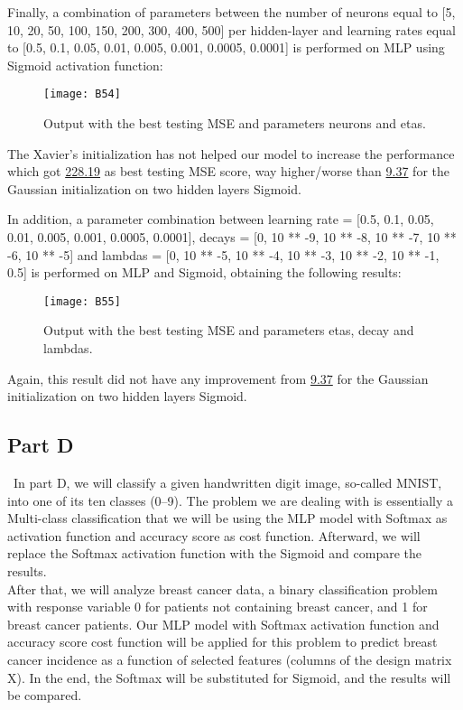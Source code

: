 Finally, a combination of parameters between the number of neurons equal to [5, 10, 20, 50, 100, 150, 200, 300, 400, 500] per hidden-layer and learning rates equal to [0.5, 0.1, 0.05, 0.01, 0.005, 0.001, 0.0005, 0.0001] is performed on MLP using Sigmoid activation function:

\begin{figure}[H]
\label{fig:B32}
\centering
\texttt{[image: B54]}
\caption{Output with the best testing MSE and parameters neurons and etas.}
\end{figure}

The Xavier's initialization has not helped our model to increase the performance which got \hyperref[fig:B23]{228.19} as best testing MSE score, way higher/worse than \hyperref[fig:B10]{9.37} for the Gaussian initialization on two hidden layers Sigmoid. 

In addition, a parameter combination between learning rate = [0.5, 0.1, 0.05, 0.01, 0.005, 0.001, 0.0005, 0.0001], decays = [0, 10 ** -9, 10 ** -8, 10 ** -7, 10 ** -6, 10 ** -5] and lambdas = [0, 10 ** -5, 10 ** -4, 10 ** -3, 10 ** -2, 10 ** -1, 0.5] is performed on MLP and Sigmoid, obtaining the following results:

\begin{figure}[H]
\label{fig:B33}
\centering
\texttt{[image: B55]}
\caption{Output with the best testing MSE and parameters etas, decay and lambdas.}
\end{figure}

Again, this result did not have any improvement from \hyperref[fig:B10]{9.37} for the Gaussian initialization on two hidden layers Sigmoid.

\subsection{Part D}
\label{chap:Part D}

\quad \, In part D, we will classify a given handwritten digit image, so-called MNIST, into one of its ten classes (0–9). The problem we are dealing with is essentially a Multi-class classification that we will be using the MLP model with Softmax as activation function and accuracy score as cost function. Afterward, we will replace the Softmax activation function with the Sigmoid and compare the results.\\

After that, we will analyze breast cancer data, a binary classification problem with response variable 0 for patients not containing breast cancer, and 1 for breast cancer patients. Our MLP model with Softmax activation function and accuracy score cost function will be applied for this problem to predict breast cancer incidence as a function of selected features (columns of the design matrix X). In the end, the Softmax will be substituted for Sigmoid, and the results will be compared.

